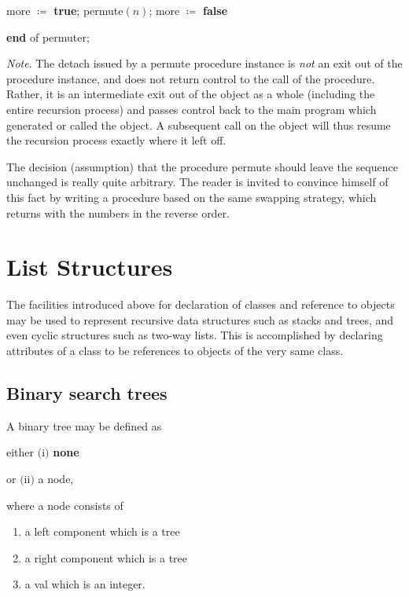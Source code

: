 \quad \quad \quad more $\coloneq$ \textbf{true}; permute$(n)$; more $\coloneq$ \textbf{false}

\quad \textbf{end} of permuter;

\textit{Note}. The detach issued by a permute procedure instance is \textit{not} an exit out of the procedure instance, and does not return control to the call of the procedure. Rather, it is an intermediate exit out of the object as a whole (including the entire recursion process) and passes control back to the main program which generated or called the object. A subsequent call on the object will thus resume the recursion process exactly where it left off.

The decision (assumption) that the procedure permute should leave the sequence unchanged is really quite arbitrary. The reader is invited to convince himself of this fact by writing a procedure based on the same swapping strategy, which returns with the numbers in the reverse order.

\section[List structures]{List Structures}

The facilities introduced above for declaration of classes and reference to
objects may be used to represent recursive data structures such as stacks and
trees, and even cyclic structures such as two-way lists. This is accomplished
by declaring attributes of a class to be references to objects of the very same
class.

\subsection{Binary search trees}

A binary tree may be defined as

\quad either \tabto*{5.35em}$($i$)$ \tabto*{7.35em}\textbf{none}

\tabto*{4em}or $($ii$)$ a node,

\noindent
where a node consists of

\begin{enumerate}[wide, nosep, label=(\alph*)]
	\item a left component which is a tree
	\item a right component which is a tree
	\item a val which is an integer.
\end{enumerate}

